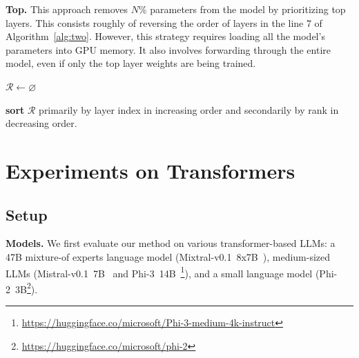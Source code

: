 \documentclass[11pt]{article}
\newcommand{\myparagraph}[1]{\noindent\textbf{#1}}
\begin{document}
\myparagraph{Top.} This approach removes $N$\%
parameters from the model by prioritizing top layers. This consists roughly of
reversing the order of layers in the line 7 of Algorithm~\ref{alg:two}.
However, this strategy requires loading all the model's parameters into GPU
memory. It also involves forwarding through the entire model, even if only the
top layer weights are being trained.

\begin{algorithm}[!ht]
    {\small{
\caption{Bottom Layers First Compression Algorithm}\label{alg:two}
$\mathcal{R} \gets \varnothing$ 

\textbf{sort} $\mathcal{R}$ primarily by layer index in increasing order and secondarily by rank in decreasing order.\\
}}
\end{algorithm}

\section{Experiments on Transformers}
\label{sec:xp}
\subsection{Setup}
\myparagraph{Models.} 
We first evaluate our method on various transformer-based LLMs: a 47B mixture-of experts language model (Mixtral-v0.1~8x7B~\citep{jiang_mixtral_2024}), medium-sized LLMs (Mistral-v0.1~7B~\citep{jiang2023mistral} and Phi-3~14B~\footnote{{\scriptsize{\url{https://huggingface.co/microsoft/Phi-3-medium-4k-instruct}}}}),
and a small language model (Phi-2~3B\footnote{{\scriptsize{\url{https://huggingface.co/microsoft/phi-2}}}}).
\end{document}
